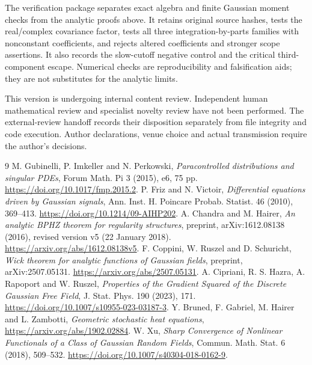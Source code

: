 \documentclass[11pt]{article}
\begin{document}
The verification package separates exact algebra and finite Gaussian moment
checks from the analytic proofs above. It retains original source hashes,
tests the real/complex covariance factor, tests all three integration-by-parts
families with nonconstant coefficients, and rejects altered coefficients and
stronger scope assertions. It also records the slow-cutoff negative control
and the critical third-component escape. Numerical checks are reproducibility
and falsification aids; they are not substitutes for the analytic limits.

This version is undergoing internal content review. Independent human
mathematical review and specialist novelty review have not been performed.
The external-review handoff records their disposition separately from file
integrity and code execution. Author declarations, venue choice and actual
transmission require the author's decisions.

\begin{thebibliography}{9}
\footnotesize
\setlength{\itemsep}{2pt}
 M. Gubinelli, P. Imkeller and N. Perkowski,
\emph{Paracontrolled distributions and singular PDEs}, Forum Math. Pi
3 (2015), e6, 75 pp. \url{https://doi.org/10.1017/fmp.2015.2}.
 P. Friz and N. Victoir,
\emph{Differential equations driven by Gaussian signals}, Ann. Inst. H.
Poincare Probab. Statist. 46 (2010), 369--413.
\url{https://doi.org/10.1214/09-AIHP202}.
 A. Chandra and M. Hairer,
\emph{An analytic BPHZ theorem for regularity structures}, preprint,
arXiv:1612.08138 (2016), revised version v5 (22 January 2018).
\url{https://arxiv.org/abs/1612.08138v5}.
 F. Coppini, W. Ruszel and D. Schuricht,
\emph{Wick theorem for analytic functions of Gaussian fields}, preprint,
arXiv:2507.05131. \url{https://arxiv.org/abs/2507.05131}.
 A. Cipriani, R. S. Hazra, A. Rapoport and W. Ruszel,
\emph{Properties of the Gradient Squared of the Discrete Gaussian Free Field},
J. Stat. Phys. 190 (2023), 171.
\url{https://doi.org/10.1007/s10955-023-03187-3}.
 Y. Bruned, F. Gabriel, M. Hairer and L. Zambotti,
\emph{Geometric stochastic heat equations},
\url{https://arxiv.org/abs/1902.02884}.
 W. Xu,
\emph{Sharp Convergence of Nonlinear Functionals of a Class of Gaussian Random Fields},
Commun. Math. Stat. 6 (2018), 509--532.
\url{https://doi.org/10.1007/s40304-018-0162-9}.
\end{thebibliography}
\end{document}
